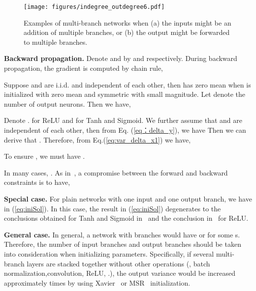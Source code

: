 \documentclass[10pt,twocolumn,letterpaper]{article}
\newcommand{\smalltitle}[1]{\vspace{0.2em}\noindent \textbf{{#1}}}
\begin{document}
\begin{figure}[t]
	\begin{center}
		\texttt{[image: figures/indegree\_outdegree6.pdf]}
	\end{center}
	\caption{Examples of multi-branch networks when (a) the inputs might be an addition of multiple branches, or (b) the output might be forwarded to multiple branches. 
}
\label{fig:indegree_outdegree}
	\vspace{-1em}
\end{figure}

\smalltitle{Backward propagation. }
Denote  and  by  and  respectively. During backward propagation, the gradient is computed by chain rule,
{\small

}
\!\!Suppose  and  are i.i.d. and independent of each other, then  has zero mean when  is initialized with zero mean and symmetric with small magnitude. 
Let  denote the number of output neurons. Then we have,
{\small

}
\!\!Denote .   for ReLU and  for Tanh and Sigmoid. 
We further assume that  and  are independent of each other, then from Eq. (\ref{eq：delta_y}), we have 
Then we can derive that .  
Therefore, from Eq.(\ref{eq:var_delta_x1}) we have,
{\small
 
}
\!\!To ensure , we must have .

In many cases, . As in~\cite{glorot2010understanding}, a compromise between the forward and backward constraints is to have,
{\small

}

\smalltitle{Special case.} For plain networks with one input and one output branch, we have  in (\ref{eq:iniSol}). In this case, the result in (\ref{eq:iniSol}) degenerates to the conclusions obtained for Tanh and Sigmoid in~\cite{glorot2010understanding}  and the conclusion in~\cite{he2015delving} for ReLU.

\smalltitle{General case.} In general, a network with branches would have  or  for some s. Therefore, the number of input branches and output branches should be taken into consideration when initializing parameters. 
Specifically, if several multi-branch layers are stacked together without other operations (\eg, batch normalization,convolution, ReLU, \etc.), the output variance would be increased approximately  times by using Xavier~\cite{glorot2010understanding} or MSR~\cite{he2015delving} initialization. 
\end{document}
